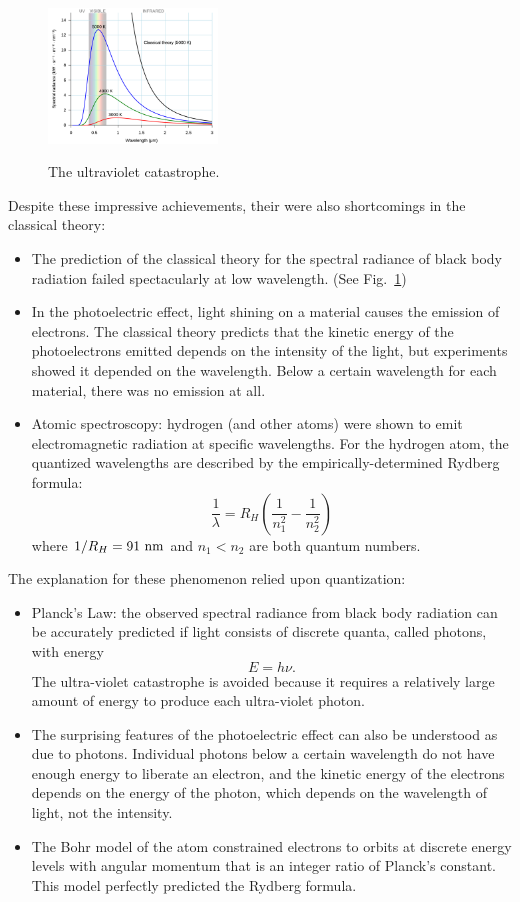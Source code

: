 \documentclass[12pt]{book}
\begin{document}
\begin{figure}[thb]
\begin{center}
{\includegraphics[width=0.40\textwidth]{figs/black_body.png}}
\end{center}
\caption{\label{fig:blackbody} The ultraviolet catastrophe.}
\end{figure}


\noindent
Despite these impressive achievements, their were also shortcomings in the classical theory:
\begin{itemize}
\item The prediction of the classical theory for the spectral radiance of black body radiation failed spectacularly at low wavelength.  (See Fig.~\ref{fig:blackbody})
\item In the photoelectric effect, light shining on a material causes the emission of electrons.  The classical theory predicts that the kinetic energy of the photoelectrons emitted depends on the intensity of the light, but experiments showed it depended on the wavelength.  Below a certain wavelength for each material, there was no emission at all.
\item Atomic spectroscopy: hydrogen (and other atoms) were shown to emit electromagnetic radiation at specific wavelengths.  For the hydrogen atom, the quantized wavelengths are described by the empirically-determined Rydberg formula:
\begin{displaymath}
\frac{1}{\lambda} = R_H \left( \frac{1}{n_1^2} - \frac{1}{n_2^2} \right)
\end{displaymath}
where $1/R_H = 91~\rm nm$ and $n_1 < n_2$ are both quantum numbers.
\end{itemize}
The explanation for these phenomenon relied upon quantization: 
\begin{itemize}
\item Planck's Law: the observed spectral radiance from black body radiation can be accurately predicted if light consists of discrete quanta, called photons, with energy 
$$E = h \nu.$$  
The ultra-violet catastrophe is avoided because it requires a relatively large amount of energy to produce each ultra-violet photon.   
\item The surprising features of the photoelectric effect can also be understood as due to photons.  Individual photons below a certain wavelength do not have enough energy to liberate an electron, and the kinetic energy of the electrons depends on the energy of the photon, which depends on the wavelength of light, not the intensity. 
\item The Bohr model of the atom constrained electrons to orbits at discrete energy levels with angular momentum that is an integer ratio of Planck's constant.  This model perfectly predicted the Rydberg formula.
\end{itemize}
\end{document}
